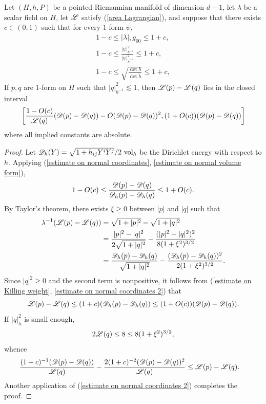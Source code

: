 \begin{lemma}\label{Taylor lemma}
Let $(H, h, P)$ be a pointed Riemannian manifold of dimension $d - 1$, let $\lambda$ be a scalar field on $H$, let $\mathscr L$ satisfy (\ref{area Lagrangian}), and suppose that there exists $c \in (0, 1)$ such that for every $1$-form $\psi$,
\begin{align}
1 - c \leq |\lambda|, g_{00} \leq 1 + c, \label{estimate on Killing weight} \\
1 - c \leq \frac{|\psi|^2_{h^{-1}}}{|\psi|^2_{\tilde h^{-1}}} \leq 1 + c, \label{estimate on normal coordinates}\\
1 - c \leq \sqrt{\frac{\det h}{\det \tilde h}} \leq 1 + c, \label{estimate on normal volume form}
\end{align}
If $p,q$ are $1$-form on $H$ such that $|q|^2_{h^{-1}} \lesssim 1$, then $\mathscr L(p) - \mathscr L(q)$ lies in the closed interval
$$\left[\frac{1 - O(c)}{\mathscr L(q)}(\mathscr D(p) - \mathscr D(q)) - O(\mathscr D(p) - \mathscr D(q))^2, (1 + O(c))(\mathscr D(p) - \mathscr D(q))\right]$$
where all implied constants are absolute.
\end{lemma}
\begin{proof}
Let $\mathscr D_h(Y) = \sqrt{1 + h_{ij} Y^i Y^j}/2 ~\mathrm{vol}_h$ be the Dirichlet energy with respect to $h$.
Applying (\ref{estimate on normal coordinates}, \ref{estimate on normal volume form}),
\begin{equation}\label{estimate on normal coordinates 2}
1 - O(c) \leq \frac{\mathscr D(p) - \mathscr D(q)}{\mathscr D_h(p) - \mathscr D_h(q)} \leq 1 + O(c).
\end{equation}
By Taylor's theorem, there exists $\xi \geq 0$ between $|p|$ and $|q|$ such that
\begin{align*}
\lambda^{-1}(\mathscr L(p) - \mathscr L(q)) &= \sqrt{1 + |p|^2} - \sqrt{1 + |q|^2}\\
&= \frac{|p|^2 - |q|^2}{2 \sqrt{1 + |q|^2}} - \frac{(|p|^2 - |q|^2)^2}{8(1 + \xi^2)^{3/2}} \\
&= \frac{\mathscr D_h(p) - \mathscr D_h(q)}{\sqrt{1 + |q|^2}} - \frac{(\mathscr D_h(p) - \mathscr D_h(q))^2}{2(1 + \xi^2)^{3/2}}.
\end{align*}
Since $|q|^2 \geq 0$ and the second term is nonpositive, it follows from (\ref{estimate on Killing weight}, \ref{estimate on normal coordinates 2}) that
$$\mathscr L(p) - \mathscr L(q) \leq (1 + c)(\mathscr D_h(p) - \mathscr D_h(q)) \leq (1 + O(c))(\mathscr D(p) - \mathscr D(q)).$$
If $|q|^2_h$ is small enough,
$$2\mathscr L(q) \leq 8 \leq 8(1 + \xi^2)^{3/2},$$
whence
\begin{align*}
\frac{(1 + c)^{-1}(\mathscr D(p) - \mathscr D(q))}{\mathscr L(q)} - \frac{2(1 + c)^{-2}(\mathscr D(p) - \mathscr D(q))^2}{\mathscr L(q)} &\leq \mathscr L(p) - \mathscr L(q).
\end{align*}
Another application of (\ref{estimate on normal coordinates 2}) completes the proof.
\end{proof}

